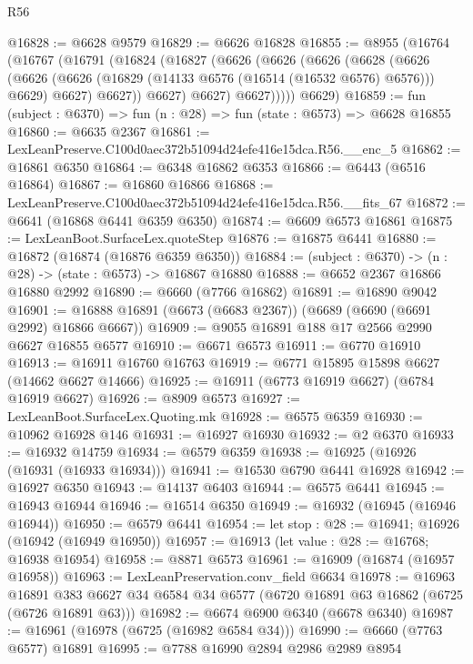 \begin{lexlean}{R56}
\begin{coremodule}
@16828 := @6628 @9579
@16829 := @6626 @16828
@16855 := @8955
    (@16764
      (@16767
        (@16791
          (@16824
            (@16827
              (@6626
                (@6626
                  (@6626
                    (@6628
                      (@6626
                        (@6626
                          (@6626 (@16829 (@14133 @6576 (@16514 (@16532 @6576) @6576))) @6629)
                          @6627)
                        @6627))
                    @6627)
                  @6627)
                @6627)))))
      @6629)
@16859 := fun (subject : @6370) => fun (n : @28) => fun (state : @6573) => @6628 @16855
@16860 := @6635 @2367
@16861 := LexLeanPreserve.C100d0aec372b51094d24efe416e15dca.R56.__enc_5
@16862 := @16861 @6350
@16864 := @6348 @16862 @6353
@16866 := @6443 (@6516 @16864)
@16867 := @16860 @16866
@16868 := LexLeanPreserve.C100d0aec372b51094d24efe416e15dca.R56.__fits_67
@16872 := @6641 (@16868 @6441 @6359 @6350)
@16874 := @6609 @6573 @16861
@16875 := LexLeanBoot.SurfaceLex.quoteStep
@16876 := @16875 @6441
@16880 := @16872 (@16874 (@16876 @6359 @6350))
@16884 := (subject : @6370) -> (n : @28) -> (state : @6573) -> @16867 @16880
@16888 := @6652 @2367 @16866 @16880 @2992
@16890 := @6660 (@7766 @16862)
@16891 := @16890 @9042
@16901 := @16888 @16891 (@6673 (@6683 @2367)) (@6689 (@6690 (@6691 @2992) @16866 @6667))
@16909 := @9055 @16891 @188 @17 @2566 @2990 @6627 @16855 @6577
@16910 := @6671 @6573
@16911 := @6770 @16910
@16913 := @16911 @16760 @16763
@16919 := @6771 @15895 @15898 @6627 (@14662 @6627 @14666)
@16925 := @16911 (@6773 @16919 @6627) (@6784 @16919 @6627)
@16926 := @8909 @6573
@16927 := LexLeanBoot.SurfaceLex.Quoting.mk
@16928 := @6575 @6359
@16930 := @10962 @16928 @146
@16931 := @16927 @16930
@16932 := @2 @6370
@16933 := @16932 @14759
@16934 := @6579 @6359
@16938 := @16925 (@16926 (@16931 (@16933 @16934)))
@16941 := @16530 @6790 @6441 @16928
@16942 := @16927 @6350
@16943 := @14137 @6403
@16944 := @6575 @6441
@16945 := @16943 @16944
@16946 := @16514 @6350
@16949 := @16932 (@16945 (@16946 @16944))
@16950 := @6579 @6441
@16954 := let stop : @28 := @16941; @16926 (@16942 (@16949 @16950))
@16957 := @16913 (let value : @28 := @16768; @16938 @16954)
@16958 := @8871 @6573
@16961 := @16909 (@16874 (@16957 @16958))
@16963 := LexLeanPreservation.conv_field @6634
@16978 := @16963
    @16891
    @383
    @6627
    @34
    @6584
    @34
    @6577
    (@6720 @16891 @63 @16862 (@6725 (@6726 @16891 @63)))
@16982 := @6674 @6900 @6340 (@6678 @6340)
@16987 := @16961 (@16978 (@6725 (@16982 @6584 @34)))
@16990 := @6660 (@7763 @6577) @16891
@16995 := @7788 @16990 @2894 @2986 @2989 @8954

\end{coremodule}
\end{lexlean}
